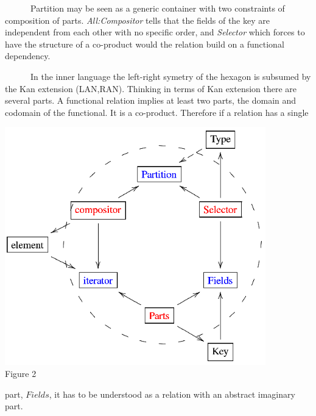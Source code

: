 \noindent
\begin{minipage}[h]{7.0cm}
~~~~~~Partition may be seen as a generic container with two constraints of composition of parts. {\it All:Compositor} tells that the fields of the key are independent from each other with no specific order, and {\it Selector} which forces to have the structure of a co-product would the relation build on a functional dependency.

~~~~~~In the inner language the left-right symetry of the hexagon is subsumed by the Kan extension (LAN,RAN). Thinking in terms of Kan extension there are several parts. A functional relation implies at least two parts, the domain and codomain of the functional. It is a co-product. Therefore if a relation has a single
\end{minipage}
\begin{minipage}[h]{7.0cm}
 \begin{center}

  \includegraphics[width=0.85\textwidth]{part8/Viallefond_P52/P52_2.eps}
  \\Figure 2

 \end{center}
\end{minipage}
\hfill
 part, $Fields$, it has to be understood as a relation with an abstract imaginary part.

